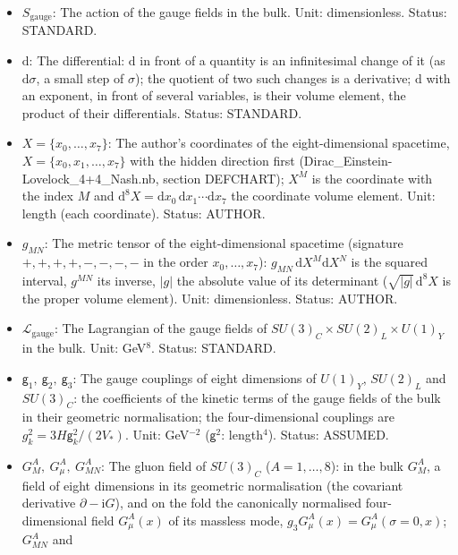 \documentclass[
  10pt,
]{article}
\providecommand{\tightlist}{%
  \setlength{\itemsep}{0pt}\setlength{\parskip}{0pt}}
\begin{document}
\begin{itemize}
\tightlist
\item
  \(S_{\mathrm{gauge}}\): The action of the gauge fields in the bulk.
  Unit: dimensionless. Status: STANDARD.
\item
  \(\mathrm{d}\): The differential: \(\mathrm{d}\) in front of a
  quantity is an infinitesimal change of it (as \(\mathrm{d}\sigma\), a
  small step of \(\sigma\)); the quotient of two such changes is a
  derivative; \(\mathrm{d}\) with an exponent, in front of several
  variables, is their volume element, the product of their
  differentials. Status: STANDARD.
\item
  \(X = \{x_0, \dots, x_7\}\): The author's coordinates of the
  eight-dimensional spacetime, \(X = \{x_0, x_1, \dots, x_7\}\) with the
  hidden direction first (Dirac\_Einstein-Lovelock\_4+4\_Nash.nb,
  section DEFCHART); \(X^M\) is the coordinate with the index \(M\) and
  \(\mathrm{d}^8X = \mathrm{d}x_0\,\mathrm{d}x_1\cdots\mathrm{d}x_7\)
  the coordinate volume element. Unit: length (each coordinate). Status:
  AUTHOR.
\item
  \(g_{MN}\): The metric tensor of the eight-dimensional spacetime
  (signature \(+,+,+,+,-,-,-,-\) in the order \(x_0, \dots, x_7\)):
  \(g_{MN}\,\mathrm{d}X^M\mathrm{d}X^N\) is the squared interval,
  \(g^{MN}\) its inverse, \(\lvert g\rvert\) the absolute value of its
  determinant (\(\sqrt{\lvert g\rvert}\,\mathrm{d}^8X\) is the proper
  volume element). Unit: dimensionless. Status: AUTHOR.
\item
  \(\mathcal{L}_{\mathrm{gauge}}\): The Lagrangian of the gauge fields
  of \(SU(3)_C\times SU(2)_L\times U(1)_Y\) in the bulk. Unit:
  GeV\(^8\). Status: STANDARD.
\item
  \(\mathsf{g}_1,\ \mathsf{g}_2,\ \mathsf{g}_3\): The gauge couplings of
  eight dimensions of \(U(1)_Y\), \(SU(2)_L\) and \(SU(3)_C\): the
  coefficients of the kinetic terms of the gauge fields of the bulk in
  their geometric normalisation; the four-dimensional couplings are
  \(g_k^2 = 3H\mathsf{g}_k^2/(2V_*)\). Unit: GeV\(^{-2}\)
  (\(\mathsf{g}^2\): length\(^4\)). Status: ASSUMED.
\item
  \(G^A_M,\ G^A_\mu,\ G^A_{MN}\): The gluon field of \(SU(3)_C\)
  (\(A = 1, \dots, 8\)): in the bulk \(G^A_M\), a field of eight
  dimensions in its geometric normalisation (the covariant derivative
  \(\partial - \mathrm{i}G\)), and on the fold the canonically
  normalised four-dimensional field \(G^A_\mu(x)\) of its massless mode,
  \(g_3G^A_\mu(x) = G^A_\mu(\sigma = 0, x)\); \(G^A_{MN}\) and

\end{itemize}
\end{document}
